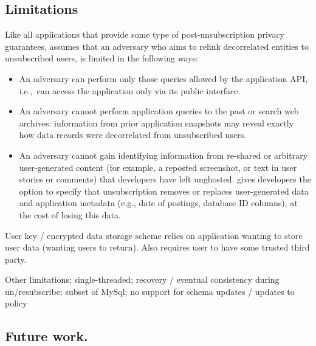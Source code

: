 \subsection{Limitations}

Like all applications that provide some type of post-unsubscription privacy guarantees, \name assumes
that an adversary who aims to relink decorrelated entities to unsubscribed users, is limited in the
following ways:
\begin{itemize}
    \item An adversary can perform only those queries allowed by the application API,
i.e.,\ can access the application only via its public interface.

    \item An adversary cannot perform application queries to the past or search web archives:
    information from prior application snapshots may reveal
    exactly how data records were decorrelated from unsubscribed users.

    \item An adversary cannot gain identifying information from re-shared or arbitrary
        user-generated content (for example, a reposted screenshot, or text in user stories or
        comments) that developers have left unghosted. 
        \name gives developers the option to specify that unsubscription removes or replaces
        user-generated data and application metadata (e.g., date of postings, database ID columns),
        at the cost of losing this data.
\end{itemize}

User key / encrypted data storage scheme relies on application wanting to store user data (wanting
users to return). Also requires user to have some trusted third party.

Other limitations: 
single-threaded;
recovery / eventual consistency during un/resubscribe;
subset of MySql;
no support for schema updates / updates to policy

\subsection{Future work.}
